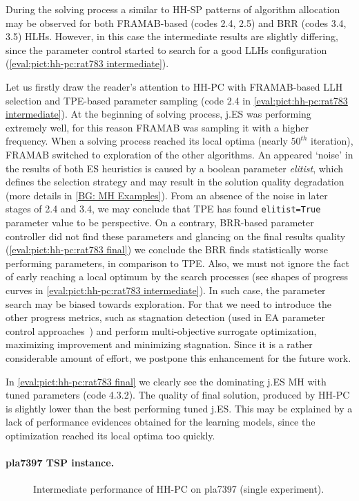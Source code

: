 During the solving process a similar to HH-SP patterns of algorithm allocation may be observed for both FRAMAB-based (codes 2.4, 2.5) and BRR (codes 3.4, 3.5) HLHs. However, in this case the intermediate results are slightly differing, since the parameter control started to search for a good LLHs configuration (\cref{eval:pict:hh-pc:rat783 intermediate}). 

Let us firstly draw the reader's attention to HH-PC with FRAMAB-based LLH selection and TPE-based parameter sampling (code 2.4 in \cref{eval:pict:hh-pc:rat783 intermediate}). At the beginning of solving process, j.ES was performing extremely well, for this reason FRAMAB was sampling it with a higher frequency. When a solving process reached its local optima (nearly $50^{th}$ iteration), FRAMAB switched to exploration of the other algorithms. An appeared `noise' in the results of both ES heuristics is caused by a boolean parameter \emph{elitist}, which defines the selection strategy and may result in the solution quality degradation (more details in \cref{BG: MH Examples}). From an absence of the noise in later stages of 2.4 and 3.4, we may conclude that TPE has found \texttt{elitist=True} parameter value to be perspective. On a contrary, BRR-based parameter controller did not find these parameters and glancing on the final results quality (\cref{eval:pict:hh-pc:rat783 final}) we conclude the BRR finds statistically worse performing parameters, in comparison to TPE. Also, we must not ignore the fact of early reaching a local optimum by the search processes (see shapes of progress curves in \cref{eval:pict:hh-pc:rat783 intermediate}). In such case, the parameter search may be biased towards exploration. For that we need to introduce the other progress metrics, such as stagnation detection (used in EA parameter control approaches~\cite{karafotias2014generic}) and perform multi-objective surrogate optimization, maximizing improvement and minimizing stagnation. Since it is a rather considerable amount of effort, we postpone this enhancement for the future work.

In \cref{eval:pict:hh-pc:rat783 final} we clearly see the dominating j.ES MH with tuned parameters (code 4.3.2). The quality of final solution, produced by HH-PC is slightly lower than the best performing tuned j.ES. This may be explained by a lack of performance evidences obtained for the learning models, since the optimization reached its local optima too quickly.


\paragraph{pla7397 TSP instance.}
\begin{figure}[t]
	\centering
	\vspace{-20pt}
	
	\caption{Intermediate performance of HH-PC on pla7397 (single experiment).}
	\vspace{-5pt}
	\label{eval:pict:hh-pc:pla7397 intermediate}
\end{figure}

